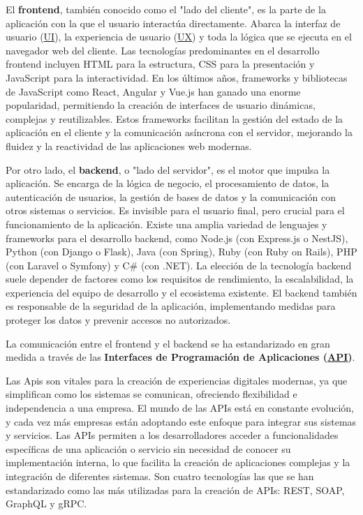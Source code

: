 El \textbf{frontend}, tambi\'{e}n conocido como el "lado del cliente", es la parte de la aplicaci\'{o}n con la que el usuario interact\'{u}a directamente. Abarca la interfaz de usuario (\hyperlink{ui}{UI}), la experiencia de usuario (\hyperlink{ux}{UX}) y toda la l\'{o}gica que se ejecuta en el navegador web del cliente. Las tecnolog\'{i}as predominantes en el desarrollo frontend incluyen HTML para la estructura, CSS para la presentaci\'{o}n y JavaScript para la interactividad. 
\newline\newline
En los \'{u}ltimos a\~{n}os, frameworks y bibliotecas de JavaScript como React, Angular y Vue.js han ganado una enorme popularidad, permitiendo la creaci\'{o}n de interfaces de usuario din\'{a}micas, complejas y reutilizables. Estos frameworks facilitan la gesti\'{o}n del estado de la aplicaci\'{o}n en el cliente y la comunicaci\'{o}n as\'{i}ncrona con el servidor, mejorando la fluidez y la reactividad de las aplicaciones web modernas.

Por otro lado, el \textbf{backend}, o "lado del servidor", es el motor que impulsa la aplicaci\'{o}n. Se encarga de la l\'{o}gica de negocio, el procesamiento de datos, la autenticaci\'{o}n de usuarios, la gesti\'{o}n de bases de datos y la comunicaci\'{o}n con otros sistemas o servicios. Es invisible para el usuario final, pero crucial para el funcionamiento de la aplicaci\'{o}n. Existe una amplia variedad de lenguajes y frameworks para el desarrollo backend, como Node.js (con Express.js o NestJS), Python (con Django o Flask), Java (con Spring), Ruby (con Ruby on Rails), PHP (con Laravel o Symfony) y C\# (con .NET). La elecci\'{o}n de la tecnolog\'{i}a backend suele depender de factores como los requisitos de rendimiento, la escalabilidad, la experiencia del equipo de desarrollo y el ecosistema existente. El backend tambi\'{e}n es responsable de la seguridad de la aplicaci\'{o}n, implementando medidas para proteger los datos y prevenir accesos no autorizados.

La comunicaci\'{o}n entre el frontend y el backend se ha estandarizado en gran medida a trav\'{e}s de las \textbf{Interfaces de Programaci\'{o}n de Aplicaciones (\hyperlink{api}{API})}. 

Las Apis son vitales para la creación de experiencias digitales modernas, ya que simplifican como los sistemas se comunican, ofreciendo flexibilidad e independencia a una empresa. El mundo de las APIs está en constante evolución, y cada vez más empresas están adoptando este enfoque para integrar sus sistemas y servicios. Las APIs permiten a los desarrolladores acceder a funcionalidades específicas de una aplicación o servicio sin necesidad de conocer su implementación interna, lo que facilita la creación de aplicaciones complejas y la integración de diferentes sistemas.
\newline
Son cuatro tecnologías las que se han estandarizado como las más utilizadas para la creación de APIs: REST, SOAP, GraphQL y gRPC.

